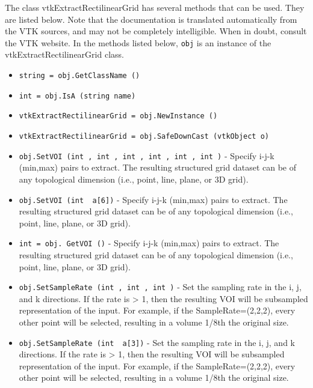 The class vtkExtractRectilinearGrid has several methods that can be used.
  They are listed below.
Note that the documentation is translated automatically from the VTK sources,
and may not be completely intelligible.  When in doubt, consult the VTK website.
In the methods listed below, \verb|obj| is an instance of the vtkExtractRectilinearGrid class.
\begin{itemize}
\item  \verb|string = obj.GetClassName ()|

\item  \verb|int = obj.IsA (string name)|

\item  \verb|vtkExtractRectilinearGrid = obj.NewInstance ()|

\item  \verb|vtkExtractRectilinearGrid = obj.SafeDownCast (vtkObject o)|

\item  \verb|obj.SetVOI (int , int , int , int , int , int )| -  Specify i-j-k (min,max) pairs to extract. The resulting structured grid
 dataset can be of any topological dimension (i.e., point, line, plane,
 or 3D grid). 

\item  \verb|obj.SetVOI (int  a[6])| -  Specify i-j-k (min,max) pairs to extract. The resulting structured grid
 dataset can be of any topological dimension (i.e., point, line, plane,
 or 3D grid). 

\item  \verb|int = obj. GetVOI ()| -  Specify i-j-k (min,max) pairs to extract. The resulting structured grid
 dataset can be of any topological dimension (i.e., point, line, plane,
 or 3D grid). 

\item  \verb|obj.SetSampleRate (int , int , int )| -  Set the sampling rate in the i, j, and k directions. If the rate is > 1,
 then the resulting VOI will be subsampled representation of the input.
 For example, if the SampleRate=(2,2,2), every other point will be
 selected, resulting in a volume 1/8th the original size.

\item  \verb|obj.SetSampleRate (int  a[3])| -  Set the sampling rate in the i, j, and k directions. If the rate is > 1,
 then the resulting VOI will be subsampled representation of the input.
 For example, if the SampleRate=(2,2,2), every other point will be
 selected, resulting in a volume 1/8th the original size.


\end{itemize}
